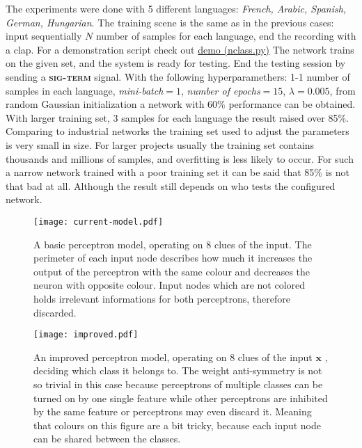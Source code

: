 The experiments were done with 5 different languages: \emph{French, Arabic, Spanish, German, Hungarian}. The training scene is the same as in the previous cases: input sequentially $N$ number of samples for each language, end the recording with a clap.
For a demonstration script check out \href{https://github.com/botcs/deepvision/tree/master/demo/audio}{demo (nclass.py)}
The network trains on the given set, and the system is ready for testing. End the testing session by sending a \textbf{\textsc{sig-term}} signal. With the following hyperparamethers: 1-1 number of samples in each language, \emph{mini-batch}$=1$, \emph{number of epochs}$=15$, $\lambda=0.005$, from random Gaussian initialization a network with 60\% performance can be obtained. With larger training set, 3 samples for each language the result raised over 85\%. Comparing to industrial networks the training set used to adjust the parameters is very small in size. For larger projects usually the training set contains thousands and millions of samples, and overfitting is less likely to occur. For such a narrow network trained with a poor training set it can be said that 85\% is not that bad at all. Although the result still depends on who tests the configured network.

\begin{figure}
	\centering
	\texttt{[image: current-model.pdf]}
	\caption{A basic perceptron model, operating on 8 clues of the input. The perimeter of each input node describes how much it increases the output of the perceptron with the same colour and decreases the neuron with opposite colour. Input nodes which are not colored holds irrelevant informations for both perceptrons, therefore discarded.}
	
	\label{fig:dumb}
\end{figure}

\begin{figure}
	\centering
	\texttt{[image: improved.pdf]}
	\caption{An improved perceptron model, operating on 8 clues of the input $\mathbf{x}$ , deciding which class it belongs to. The weight anti-symmetry is not so trivial in this case because perceptrons of multiple classes can be turned on by one single feature while other perceptrons are inhibited by the same feature or perceptrons may even discard it. Meaning that colours on this figure are a bit tricky, because each input node can be shared between the classes.}
	
	\label{fig:improved}
\end{figure}

